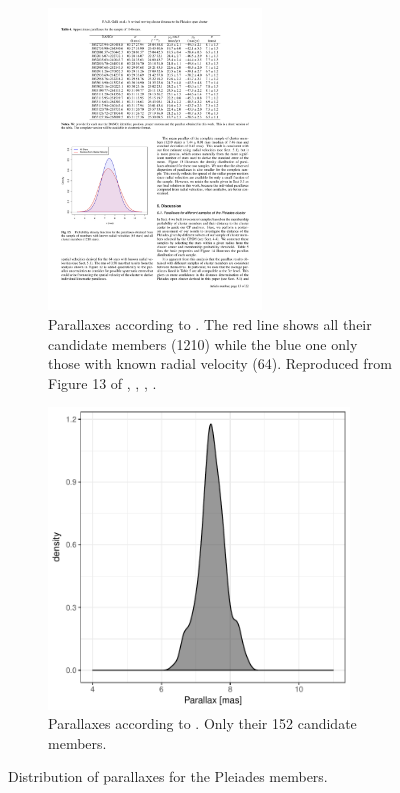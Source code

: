 \begin{figure}[ht!]
    \centering
    \begin{subfigure}[t]{\textwidth}
    \centering
        \includegraphics[height=8cm]{background/Figures/F13_Galli2017.pdf}
        \caption{Parallaxes according to \citet{Galli2017}. The red line shows all their candidate members (1210) while the blue one only those with known radial velocity (64). Reproduced from Figure 13 of \citet{Galli2017}, \textit{}, , .}
        \label{fig:parallaxPhillip}
    \end{subfigure}
    \begin{subfigure}[t]{\textwidth}
    \centering
       \includegraphics[height=8cm]{background/Figures/Parallax_GaiaCol2017.pdf}
        \caption{Parallaxes according to \citet{2017A&A...601A..19G}. Only their 152 candidate members.}
        \label{fig:parallaxTGAS} 
    \end{subfigure}
    \caption{Distribution of parallaxes for the Pleiades members.}
\end{figure}



